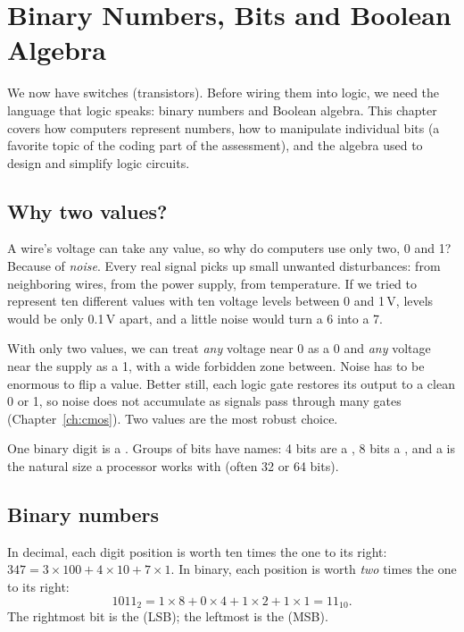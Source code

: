 \chapter{Binary Numbers, Bits and Boolean Algebra}
\label{ch:binary}

We now have switches (transistors). Before wiring them into logic, we need the language that logic speaks: binary numbers and Boolean algebra. This chapter covers how computers represent numbers, how to manipulate individual bits (a favorite topic of the coding part of the assessment), and the algebra used to design and simplify logic circuits.

\section{Why two values?}

A wire's voltage can take any value, so why do computers use only two, 0 and 1? Because of \emph{noise}. Every real signal picks up small unwanted disturbances: from neighboring wires, from the power supply, from temperature. If we tried to represent ten different values with ten voltage levels between 0 and 1\,V, levels would be only 0.1\,V apart, and a little noise would turn a 6 into a 7.

With only two values, we can treat \emph{any} voltage near 0 as a 0 and \emph{any} voltage near the supply as a 1, with a wide forbidden zone between. Noise has to be enormous to flip a value. Better still, each logic gate restores its output to a clean 0 or 1, so noise does not accumulate as signals pass through many gates (Chapter~\ref{ch:cmos}). Two values are the most robust choice.

One binary digit is a . Groups of bits have names: 4 bits are a , 8 bits a , and a  is the natural size a processor works with (often 32 or 64 bits).

\section{Binary numbers}

In decimal, each digit position is worth ten times the one to its right: $347 = 3\times100 + 4\times10 + 7\times1$. In binary, each position is worth \emph{two} times the one to its right:
\[
  1011_2 = 1\times8 + 0\times4 + 1\times2 + 1\times1 = 11_{10}.
\]
The rightmost bit is the  (LSB); the leftmost is the  (MSB).

